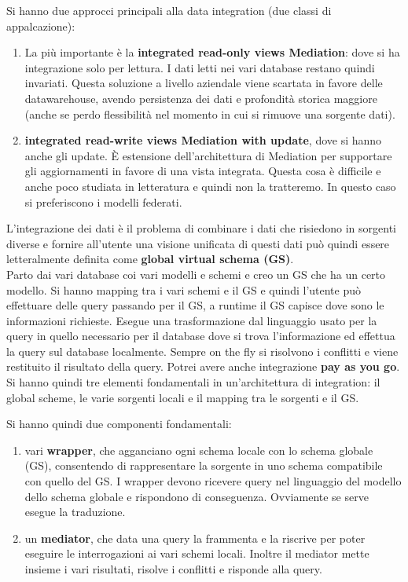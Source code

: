 Si hanno due approcci principali alla data integration (due classi di appalcazione):
\begin{enumerate}
  \item La più importante è la \textbf{integrated read-only views Mediation}: dove si ha integrazione solo per lettura. I dati letti nei vari database restano quindi invariati. Questa soluzione a livello aziendale viene scartata in favore delle datawarehouse, avendo persistenza dei dati e profondità storica maggiore (anche se perdo flessibilità nel momento in cui si rimuove una sorgente dati).
  \item \textbf{integrated read-write views Mediation with update}, dove si hanno anche gli update. È estensione dell'architettura di Mediation per supportare gli aggiornamenti in favore di una vista integrata. Questa cosa è difficile e anche poco studiata in letteratura e quindi non la tratteremo. In questo caso si preferiscono i modelli federati.
\end{enumerate}
L'integrazione dei dati è il problema di combinare i dati che risiedono in sorgenti diverse e fornire all'utente una visione unificata di questi dati può quindi essere letteralmente definita come \textbf{global virtual schema (GS)}.\\ 
Parto dai vari database coi vari modelli e schemi e creo un GS che ha un certo modello. Si hanno mapping tra i vari schemi e il GS e quindi l'utente può effettuare delle query passando per il GS, a runtime il GS capisce dove sono le informazioni richieste. Esegue una trasformazione dal linguaggio usato per la query in quello necessario per il database dove si trova l'informazione ed effettua la query sul database localmente. Sempre on the fly si risolvono i conflitti e viene restituito il risultato della query. Potrei avere anche integrazione \textbf{pay as you go}.\\
Si hanno quindi tre elementi fondamentali in un'architettura di integration: il global scheme, le varie sorgenti locali e il mapping tra le sorgenti e il GS.

Si hanno quindi due componenti fondamentali:
\begin{enumerate}
  \item vari \textbf{wrapper}, che agganciano ogni schema locale con lo schema globale (GS), consentendo di rappresentare la sorgente in uno schema compatibile con quello del GS. I wrapper devono ricevere query nel linguaggio del modello dello schema globale e rispondono di conseguenza. Ovviamente se serve esegue la traduzione. 
  \item un \textbf{mediator}, che data una query la frammenta e la riscrive per poter eseguire le interrogazioni ai vari schemi locali. Inoltre il mediator mette insieme i vari risultati, risolve i conflitti e risponde alla query.
\end{enumerate}

